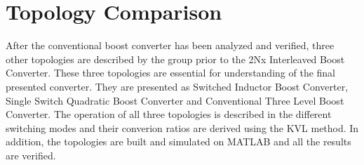 \section{Topology Comparison}\label{ch:COMP}

After the conventional boost converter has been analyzed and verified,
three other topologies are described by the group prior to the 2Nx Interleaved Boost Converter. These three topologies are essential for understanding of the final presented converter. They are presented as Switched Inductor Boost Converter, Single Switch Quadratic Boost Converter and Conventional Three Level Boost Converter. The operation of all three topologies is described in the different switching modes and their converion ratios are derived using the KVL method. In addition, the topologies are built and simulated on MATLAB and all the results are verified.

